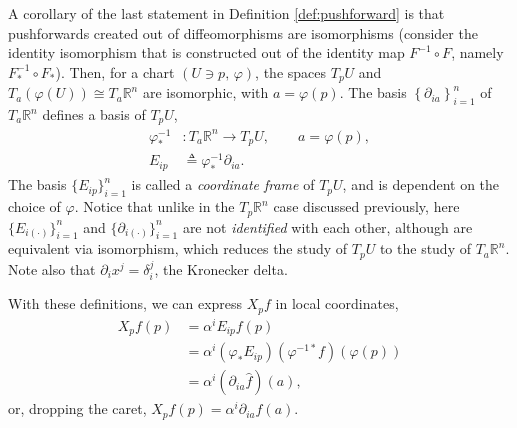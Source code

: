 \documentclass[psamsfonts]{amsart}
\theoremstyle{definition}
\theoremstyle{remark}
\newcommand*\R{\mathds{R}}
\numberwithin{equation}{section}
\begin{document}
A corollary of the last statement in Definition \ref{def:pushforward} is that pushforwards created out of diffeomorphisms are isomorphisms (consider the identity isomorphism that is constructed out of the identity map $F^{-1}\circ F$, namely $F_*^{-1}\circ F_*$). Then, for a chart $(U\ni p,\, \varphi)$, the spaces $T_pU$ and $T_{a}\left(\varphi(U)\right) \cong T_{a}\R^n$ are isomorphic, with $a = \varphi(p)$. The basis $ \left\{\partial_{ia}\right\}_{i = 1}^n$ of $T_{a}\R^n$ defines a basis of $T_pU$, 
\begin{equation}
\begin{aligned}
\varphi^{-1}_*&:T_{a}\R^n\rightarrow T_pU, \qquad a = \varphi(p),\\
E_{ip} &\triangleq{} \varphi^{-1}_*\partial_{ia}.
\end{aligned}
\end{equation}
The basis $\{E_{ip}\}_{i=1}^n$ is called a \textit{coordinate frame} of $T_pU$, and is dependent on the choice of $\varphi$. Notice that unlike in the $T_p\R^n$ case discussed previously, here $\{E_{i(\cdot)}\}_{i = 1}^n$ and $\{\partial_{i(\cdot)}\}_{i = 1}^n$ are not \textit{identified} with each other, although are equivalent via isomorphism, which reduces the study of $T_pU$ to the study of $T_{a}\R^n$. Note also that $\partial_i x^j = \delta_{i}^j$, the Kronecker delta. 

With these definitions, we can express $X_pf$ in local coordinates, 
\begin{equation}
\begin{aligned}
X_pf(p) & = {} \alpha^i E_{ip}f(p) \\
& = {} \alpha^i (\varphi_* E_{ip})(\varphi^{-1*}f)(\varphi(p))\\
& = {} \alpha^i \left(\partial_{ia}\hat f\right)(a),%
\end{aligned}
\end{equation}
or, dropping the caret, $X_p f(p) = \alpha^i\partial_{ia} f(a)$. 
\end{document}
